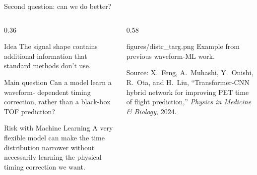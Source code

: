 \begin{frame}{Second question: can we do better?}

\small
\begin{columns}[T,totalwidth=\textwidth]
\begin{column}{0.36\textwidth}
\begin{block}{Idea}
The signal shape contains additional information that standard methods don't use.
\end{block}

\begin{block}{Main question}
Can a model learn a waveform- dependent timing correction, rather than a black-box TOF prediction?
\end{block}

\begin{alertblock}{Risk with Machine Learning}
A very flexible model can make the time distribution narrower without necessarily learning the physical timing correction we want.
\end{alertblock}
\end{column}

\begin{column}{0.58\textwidth}
\centering

\smartimage[0.78\linewidth]{0.65\textheight}
{figures/distr_targ.png}
{Example from previous waveform-ML work.}

\vspace{0.15em}

{
Source: X.~Feng, A.~Muhashi, Y.~Onishi, R.~Ota, and H.~Liu,
``Transformer-CNN hybrid network for improving PET time of flight prediction,''
\textit{Physics in Medicine \& Biology}, 2024.
}
\end{column}
\end{columns}
\end{frame}
